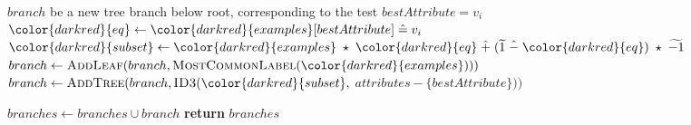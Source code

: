 \begin{algorithm}[H]
\begin{algorithmic}[1]
         $branch$ {\small be a new tree branch below root, corresponding to the test} $bestAttribute = v_i$
      \State ${\color{darkred}{eq}} \gets {\color{darkred}{examples}}[bestAttribute] \heq v_i$ 
      \State ${\color{darkred}{subset}} \gets {\color{darkred}{examples}} \hmul {\color{darkred}{eq}} \hplus (\enc{1} \hminus {\color{darkred}{eq}}) \hmul \enc{-1} $ 
            \State $branch \gets \textsc{AddLeaf}(branch, \textsc{MostCommonLabel}({\color{darkred}{examples}})))$ 
        \Else
            \State $branch \gets \textsc{AddTree}(branch, \textsc{ID3}({\color{darkred}{subset}},$ $attributes - \{bestAttribute\}))$ \par\hfill {}
        \EndIf
        \State $branches \gets branches \cup branch$
    \EndFor
    \State \textbf{return} $branches$

\EndProcedure

\end{algorithmic}
\end{algorithm}

